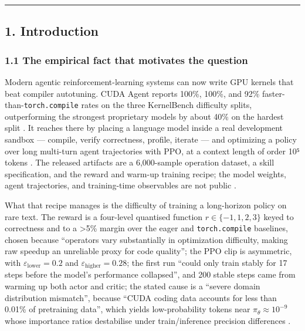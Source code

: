 \documentclass[
  11pt,
]{article}
\begin{document}
\begin{center}\rule{0.5\linewidth}{0.5pt}\end{center}

\hypertarget{introduction}{%
\subsection{1. Introduction}\label{introduction}}

\hypertarget{the-empirical-fact-that-motivates-the-question}{%
\subsubsection{1.1 The empirical fact that motivates the question}\label{the-empirical-fact-that-motivates-the-question}}

Modern agentic reinforcement-learning systems can now write GPU kernels that beat compiler autotuning. CUDA Agent reports 100\%, 100\%, and 92\% faster-than-\texttt{torch.compile} rates on the three KernelBench difficulty splits, outperforming the strongest proprietary models by about 40\% on the hardest split \cite{cuda1,kernelbench2}. It reaches there by placing a language model inside a real development sandbox --- compile, verify correctness, profile, iterate --- and optimizing a policy over long multi-turn agent trajectories with PPO, at a context length of order 10⁵ tokens \cite{cuda1}. The released artifacts are a 6,000-sample operation dataset, a skill specification, and the reward and warm-up training recipe; the model weights, agent trajectories, and training-time observables are not public \cite{cuda1,adaexplore3}.

What that recipe manages is the difficulty of training a long-horizon policy on rare text. The reward is a four-level quantised function \(r \in \{-1, 1, 2, 3\}\) keyed to correctness and to a \textgreater5\% margin over the eager and \texttt{torch.compile} baselines, chosen because ``operators vary substantially in optimization difficulty, making raw speedup an unreliable proxy for code quality''; the PPO clip is asymmetric, with \(\varepsilon_{\text{lower}} = 0.2\) and \(\varepsilon_{\text{higher}} = 0.28\); the first run ``could only train stably for 17 steps before the model's performance collapsed'', and 200 stable steps came from warming up both actor and critic; the stated cause is a ``severe domain distribution mismatch'', because ``CUDA coding data accounts for less than 0.01\% of pretraining data'', which yields low-probability tokens near \(\pi_\theta \approx 10^{-9}\) whose importance ratios destabilise under train/inference precision differences \cite[Sec.~ 5.1-5.2]{cuda1}.
\end{document}
